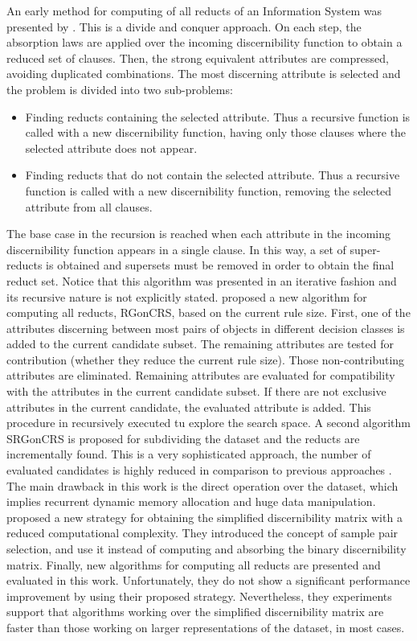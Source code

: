 \documentclass[authoryear,preprint,review,12pt]{elsarticle}
\begin{document}
  An early method for computing of all reducts of an Information System was presented by \linebreak
  \cite{Starzyk99,Starzyk00}.
  This is a divide and conquer approach. On each step, the absorption laws are applied over the incoming
  discernibility function to obtain a reduced set of clauses. Then, the strong equivalent attributes are 
  compressed, avoiding duplicated combinations. The most discerning attribute is selected and the problem 
  is divided into two sub-problems: 
  \begin{itemize}
  \item Finding reducts containing the selected attribute. Thus a recursive function is called with a new 
  discernibility function, having only those clauses where the selected attribute does not appear.
  \item Finding reducts that do not contain the selected attribute. Thus a recursive function is called with 
  a new discernibility function, removing the selected attribute from all clauses.
  \end{itemize}
  The base case in the recursion is reached when each attribute in the incoming discernibility function appears 
  in a single clause. In this way, a set of super-reducts is obtained and supersets must be removed in order 
  to obtain the final reduct set. Notice that this algorithm was presented in an iterative fashion and its 
  recursive nature is not explicitly stated.  
  \cite{WangP07} proposed a new algorithm for computing all reducts, RGonCRS, based on the current rule size. 
  First, one of the attributes discerning between most pairs of objects in different decision classes is added 
  to the current candidate subset. 
  The remaining attributes are tested for contribution (whether they reduce the current rule
  size). Those non-contributing attributes are eliminated. Remaining attributes are evaluated for compatibility 
  with the attributes in the current candidate subset. If there are not exclusive attributes in the current
  candidate, the evaluated attribute is added. This procedure in recursively executed tu explore the search
  space. A second algorithm SRGonCRS is proposed for subdividing the dataset and the reducts are incrementally
  found. This is a very sophisticated approach, the number of evaluated candidates is highly reduced in comparison
  to previous approaches \citep{Bazan2001,Ohrn00}. The main drawback in this work is the direct operation over
  the dataset, which implies recurrent dynamic memory allocation and huge data manipulation.
  \cite{Chen2012} proposed a new strategy for obtaining the simplified discernibility matrix with a reduced
  computational complexity. They introduced the concept of sample pair selection, and use it instead of computing 
  and absorbing the binary discernibility matrix. Finally, new algorithms for computing all reducts are presented
  and evaluated in this work. Unfortunately, they do not show a significant performance improvement by using their
  proposed strategy. Nevertheless, they experiments support that algorithms working over the simplified 
  discernibility matrix are faster than those working on larger representations of the dataset, in most cases.
  
\end{document}
